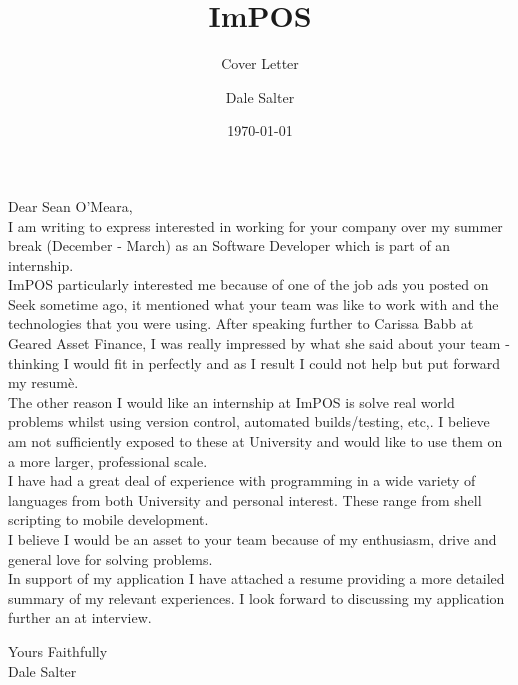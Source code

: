 \documentclass[10pt]{scrartcl}
\title{ImPOS}
\subtitle{Cover Letter}
\author{Dale Salter}
\date{\today}
\begin{document}

\maketitle

\noindent Dear Sean O'Meara, \\

\noindent I am writing to express interested in working for your company over my summer break (December - March) as an Software Developer which is part of an internship. \\

\noindent ImPOS particularly interested me because of one of the job ads you posted on Seek sometime ago, it mentioned what your team was like to work with
            and the technologies that you were using. After speaking further to Carissa Babb at Geared Asset Finance, I was really impressed by what she said about your team - thinking I would fit in perfectly and as I result I could not help but put forward my resumè. \\

\noindent The other reason I would like an internship at ImPOS is solve real world problems whilst using version control, automated builds/testing, etc,.
            I believe am not sufficiently exposed to these at University and would like to use them on a more larger, professional scale. \\

\noindent I have had a great deal of experience with programming in a wide variety of languages from both University and personal interest.
            These range from shell scripting to mobile development. \\

\noindent I believe I would be an asset to your team because of my enthusiasm, drive and general love for solving problems. \\

\noindent In support of my application I have attached a resume providing a more detailed summary of my relevant experiences. I look forward to discussing my application
            further an at interview.

\vspace{10 mm}

\noindent Yours Faithfully \\

\noindent Dale Salter
\end{document}
